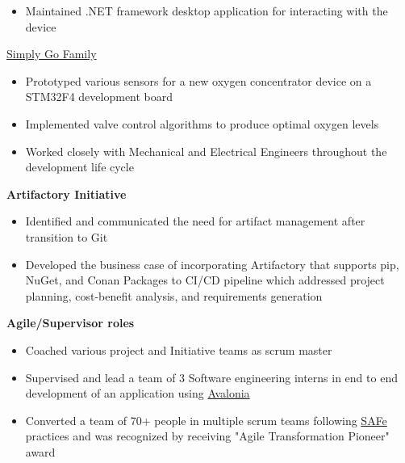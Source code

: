 \begin{cventries}
{\begin{cvitems}
{\begin{itemize}
        \item Maintained .NET framework desktop application for interacting with the device
    \end{itemize} 
}
\item 
{
    \href{https://www.usa.philips.com/healthcare/product/HCNOCTN350/simplygo-mini-portable-oxygen-concentrator-poc}{\color{RoyalBlue}Simply Go Family} 
    \begin{itemize}
        \item Prototyped various sensors for a new oxygen concentrator device on a STM32F4 development board 
        \item Implemented valve control algorithms to produce optimal oxygen levels 
        \item Worked closely with Mechanical and Electrical Engineers throughout the development life cycle 
    \end{itemize} 
}
\item 
{
    \textbf{Artifactory Initiative}
    \begin{itemize}
        \item Identified and communicated the need for artifact management after transition to Git
        \item Developed the business case of incorporating Artifactory that supports pip, NuGet, and Conan Packages to CI/CD pipeline which addressed 
        project planning, cost-benefit analysis, and requirements generation
    \end{itemize} 
}
\item 
{
    \textbf{Agile/Supervisor roles} 
    \begin{itemize}
        \item Coached various project and Initiative teams as scrum master 
        \item Supervised and lead a team of 3 Software engineering interns in end to end development of an application using \href{https://avaloniaui.net/}{\color{RoyalBlue}Avalonia}
        \item Converted a team of 70+ people in multiple scrum teams following \href{https://www.scaledagileframework.com/}{\color{RoyalBlue}SAFe} practices and was
        recognized by receiving "Agile Transformation Pioneer" award
    \end{itemize} 
}
\end{cvitems}
}




\end{cventries}
